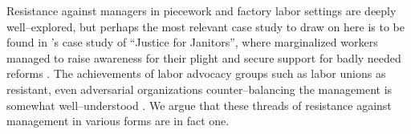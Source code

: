 \documentclass[trackingWork]{subfiles}
\begin{document}
{Resistance against managers in piecework and factory labor settings are deeply well--explored,
but perhaps the most relevant case study to draw on here is to be found in
\citeauthor{waldinger1996helots}'s case study of ``Justice for Janitors'',
where marginalized workers managed to raise awareness for their plight and secure support for badly needed reforms
\cite{waldinger1996helots}.
The achievements of labor advocacy groups such as labor unions as resistant,
even adversarial organizations counter--balancing the management
is somewhat well--understood
\cite{russell1982collective,craig1992behavior}.
We argue that these threads of resistance against management in various forms
are in fact one.
}


\onlyinsubfile{
  \balance{}
  \printbibliography
}
\end{document}
